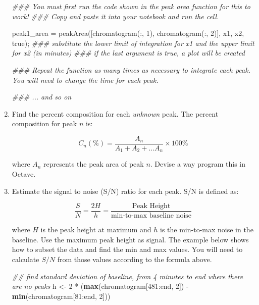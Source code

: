 \documentclass[]{tufte-book}
\newenvironment{Shaded}{}{}
\newcommand{\CommentTok}[1]{\textcolor[rgb]{0.38,0.63,0.69}{\textit{#1}}}
\newcommand{\DecValTok}[1]{\textcolor[rgb]{0.25,0.63,0.44}{#1}}
\newcommand{\FloatTok}[1]{\textcolor[rgb]{0.25,0.63,0.44}{#1}}
\newcommand{\FunctionTok}[1]{\textcolor[rgb]{0.02,0.16,0.49}{#1}}
\newcommand{\KeywordTok}[1]{\textcolor[rgb]{0.00,0.44,0.13}{\textbf{#1}}}
\newcommand{\NormalTok}[1]{#1}
\newcommand{\OperatorTok}[1]{\textcolor[rgb]{0.40,0.40,0.40}{#1}}
\newcommand{\StringTok}[1]{\textcolor[rgb]{0.25,0.44,0.63}{#1}}
\begin{document}
\begin{enumerate}
\begin{Shaded}
\begin{Highlighting}[]
\CommentTok{### You must first run the code shown in the peak area function for this to work!}
\CommentTok{### Copy and paste it into your notebook and run the cell.}

\NormalTok{peak1_area }\OperatorTok{=}\NormalTok{ peakArea([chromatogram(}\OperatorTok{:,} \FloatTok{1}\NormalTok{)}\OperatorTok{,}\NormalTok{ chromatogram(}\OperatorTok{:,} \FloatTok{2}\NormalTok{)]}\OperatorTok{,}\NormalTok{ x1}\OperatorTok{,}\NormalTok{ x2}\OperatorTok{,} \FunctionTok{true}\NormalTok{)}\OperatorTok{;}
\CommentTok{### substitute the lower limit of integration for x1 and the upper limit for x2 (in minutes)}
\CommentTok{### if the last argument is true, a plot will be created}

\CommentTok{### Repeat the function as many times as necessary to integrate each peak.  You will need to change the time for each peak.}

\CommentTok{### ... and so on}
\end{Highlighting}
\end{Shaded}
\item
  Find the percent composition for each \emph{unknown} peak. The percent composition for peak \(n\) is:

  \[
   C_n(\%)=\frac{A_n}{A_1 + A_2 + ... A_n} \times 100\%
   \]

  where \(A_n\) represents the peak area of peak \(n\). Devise a way program this in Octave.
\item
  Estimate the signal to noise (S/N) ratio for each peak. S/N is defined as:

  \[
   \frac{S}{N} = \frac{2H}{h} = \frac{\text{Peak Height}}{\text{min-to-max baseline noise}}
   \]

  where \(H\) is the peak height at maximum and \(h\) is the min-to-max noise in the baseline. Use the maximum peak height as signal. The example below shows how to subset the data and find the min and max values. You will need to calculate \(S/N\) from those values according to the formula above.

\begin{Shaded}
\begin{Highlighting}[]
\CommentTok{## find standard deviation of baseline, from 4 minutes to end where there are no peaks}
\NormalTok{h <-}\StringTok{ }\DecValTok{2} \OperatorTok{*}\StringTok{ }\NormalTok{(}\KeywordTok{max}\NormalTok{(chromatogram[}\DecValTok{481}\OperatorTok{:}\NormalTok{end, }\DecValTok{2}\NormalTok{]) }\OperatorTok{-}\StringTok{ }\KeywordTok{min}\NormalTok{(chromatogram[}\DecValTok{81}\OperatorTok{:}\NormalTok{end, }\DecValTok{2}\NormalTok{]))}


\end{Highlighting}
\end{Shaded}
\end{enumerate}
\end{document}
